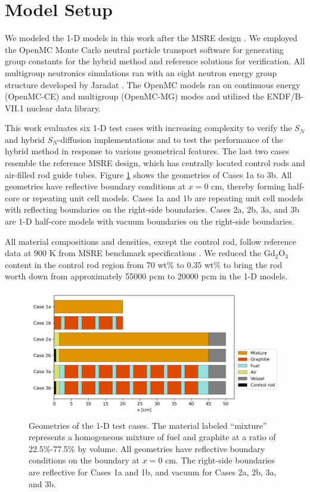 \documentclass[letterpaper]{mc2025}
\begin{document}
\section{Model Setup}

We modeled the 1-D models in this work after the \gls*{MSRE} design \cite{robertson_msre_1965}. We
employed the OpenMC Monte
Carlo neutral particle transport software \cite{romano_openmc:_2015} for generating group constants
for the hybrid method and reference solutions for verification. All multigroup
neutronics simulations ran with an eight neutron energy group structure developed by Jaradat
\cite{jaradat_development_2021-1}. The OpenMC models ran on continuous energy (OpenMC-CE) and
multigroup (OpenMC-MG) modes and utilized the ENDF/B-VII.1 nuclear data library.

This work evaluates six 1-D test cases with increasing complexity to verify the $S_N$ and hybrid
$S_N$-diffusion implementations and to test the performance of the hybrid
method in response to various geometrical features. The last two cases resemble the
reference \gls*{MSRE} design, which has centrally located control rods
and air-filled rod guide tubes. Figure \ref{fig:case-geom} shows the geometries of Cases 1a to
3b. All geometries have reflective boundary conditions at $x=0$ cm, thereby
forming half-core or repeating unit cell models. Cases 1a and 1b are repeating unit
cell models with reflecting boundaries on the right-side boundaries. Cases 2a, 2b, 3a, and 3b
are 1-D half-core models with vacuum boundaries on the right-side boundaries.

All material compositions and densities, except the control rod, follow
reference data at 900 K from \gls*{MSRE} benchmark specifications \cite{fratoni_molten_2020}.
We reduced the Gd$_2$O$_3$ content in the control rod region from 70 wt\% to 0.35 wt\% to bring the
rod worth down from approximately 55000 pcm to 20000 pcm in the 1-D models.
%
\begin{figure}[htb!]
  \centering
  \includegraphics[width=0.75\columnwidth]{case-geometry}
  \caption{Geometries of the 1-D test cases. The material labeled ``mixture'' represents a
    homogeneous mixture of fuel and graphite at a ratio of 22.5\%-77.5\% by volume. All geometries
    have reflective boundary conditions on the boundary at $x=0$ cm. The right-side boundaries are
    reflective for Cases 1a and 1b, and vacuum for Cases 2a, 2b, 3a, and 3b.}
  \label{fig:case-geom}
\end{figure}
\end{document}
